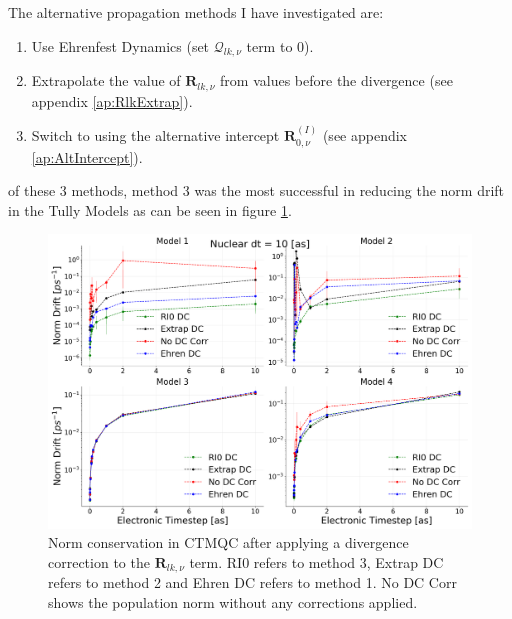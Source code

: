 \clearpage
\noindent The alternative propagation methods I have investigated are:
\begin{enumerate}
	\item Use Ehrenfest Dynamics (set $\mathcal{Q}_{lk, \nu}$ term to 0).
	\item Extrapolate the value of $\mathbf{R}_{lk, \nu}$ from values before the divergence (see appendix \ref{ap:RlkExtrap}).
	\item Switch to using the alternative intercept $\mathbf{R}_{0, \nu}^{(I)}$ (see appendix \ref{ap:AltIntercept}).
\end{enumerate}
of these 3 methods, method 3 was the most successful in reducing the norm drift in the Tully Models as can be seen in figure \ref{fig:NormConsCorr}.
\begin{figure}[h]
	\includegraphics[width=\textwidth]{img/CTMQC/TullyModels/CTMQC_Norm_Conservation_wCorr.png}
	\caption{\label{fig:NormConsCorr}Norm conservation in CTMQC after applying a divergence correction to the $\mathbf{R}_{lk, \nu}$ term. RI0 refers to method 3, Extrap DC refers to method 2 and Ehren DC refers to method 1. No DC Corr shows the population norm without any corrections applied.}
\end{figure}
